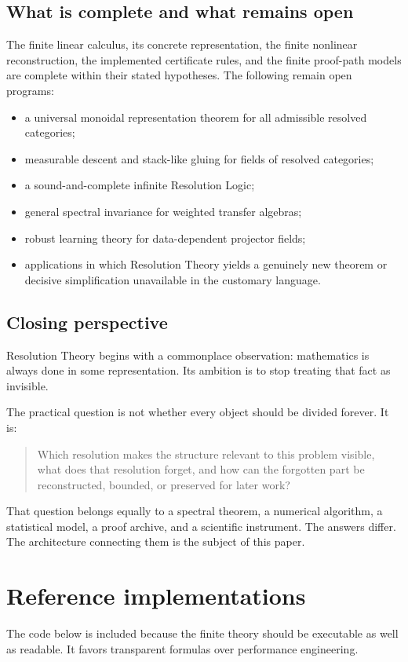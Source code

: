\documentclass[11pt,oneside]{book}
\theoremstyle{remark}
\begin{document}
\section{What is complete and what remains open}
The finite linear calculus, its concrete representation, the finite nonlinear reconstruction, the implemented certificate rules, and the finite proof-path models are complete within their stated hypotheses.  The following remain open programs:
\begin{itemize}
\item a universal monoidal representation theorem for all admissible resolved categories;
\item measurable descent and stack-like gluing for fields of resolved categories;
\item a sound-and-complete infinite Resolution Logic;
\item general spectral invariance for weighted transfer algebras;
\item robust learning theory for data-dependent projector fields;
\item applications in which Resolution Theory yields a genuinely new theorem or decisive simplification unavailable in the customary language.
\end{itemize}

\section{Closing perspective}
Resolution Theory begins with a commonplace observation: mathematics is always done in some representation.  Its ambition is to stop treating that fact as invisible.

The practical question is not whether every object should be divided forever.  It is:
\begin{quote}
Which resolution makes the structure relevant to this problem visible, what does that resolution forget, and how can the forgotten part be reconstructed, bounded, or preserved for later work?
\end{quote}

That question belongs equally to a spectral theorem, a numerical algorithm, a statistical model, a proof archive, and a scientific instrument.  The answers differ.  The architecture connecting them is the subject of this paper.

\appendix
\chapter{Reference implementations}
The code below is included because the finite theory should be executable as well as readable.  It favors transparent formulas over performance engineering.
\end{document}
